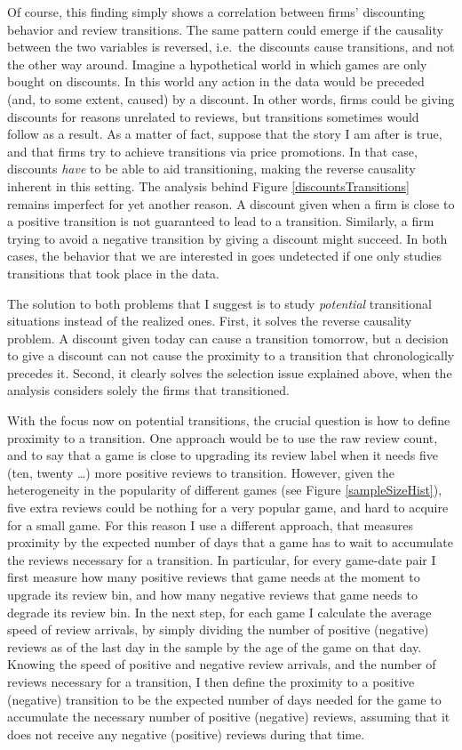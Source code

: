 \documentclass[12pt,pagebackref]{article}
\begin{document}
Of course, this finding simply shows a correlation between firms'
discounting behavior and review transitions. The same pattern could
emerge if the causality between the two variables is reversed, i.e.~the
discounts cause transitions, and not the other way around. Imagine a
hypothetical world in which games are only bought on discounts. In this
world any action in the data would be preceded (and, to some extent,
caused) by a discount. In other words, firms could be giving discounts
for reasons unrelated to reviews, but transitions sometimes would follow
as a result. As a matter of fact, suppose that the story I am after is
true, and that firms try to achieve transitions via price promotions. In
that case, discounts \emph{have} to be able to aid transitioning, making
the reverse causality inherent in this setting. The analysis behind
Figure \ref{discountsTransitions} remains imperfect for yet another
reason. A discount given when a firm is close to a positive transition
is not guaranteed to lead to a transition. Similarly, a firm trying to
avoid a negative transition by giving a discount might succeed. In both
cases, the behavior that we are interested in goes undetected if one
only studies transitions that took place in the data.

The solution to both problems that I suggest is to study
\emph{potential} transitional situations instead of the realized ones.
First, it solves the reverse causality problem. A discount given today
can cause a transition tomorrow, but a decision to give a discount can
not cause the proximity to a transition that chronologically precedes
it. Second, it clearly solves the selection issue explained above, when
the analysis considers solely the firms that transitioned.

With the focus now on potential transitions, the crucial question is how
to define proximity to a transition. One approach would be to use the
raw review count, and to say that a game is close to upgrading its
review label when it needs five (ten, twenty \ldots{}) more positive
reviews to transition. However, given the heterogeneity in the
popularity of different games (see Figure \ref{sampleSizeHist}), five
extra reviews could be nothing for a very popular game, and hard to
acquire for a small game. For this reason I use a different approach,
that measures proximity by the expected number of days that a game has
to wait to accumulate the reviews necessary for a transition. In
particular, for every game-date pair I first measure how many positive
reviews that game needs at the moment to upgrade its review bin, and how
many negative reviews that game needs to degrade its review bin. In the
next step, for each game I calculate the average speed of review
arrivals, by simply dividing the number of positive (negative) reviews
as of the last day in the sample by the age of the game on that day.
Knowing the speed of positive and negative review arrivals, and the
number of reviews necessary for a transition, I then define the
proximity to a positive (negative) transition to be the expected number
of days needed for the game to accumulate the necessary number of
positive (negative) reviews, assuming that it does not receive any
negative (positive) reviews during that time.
\end{document}
